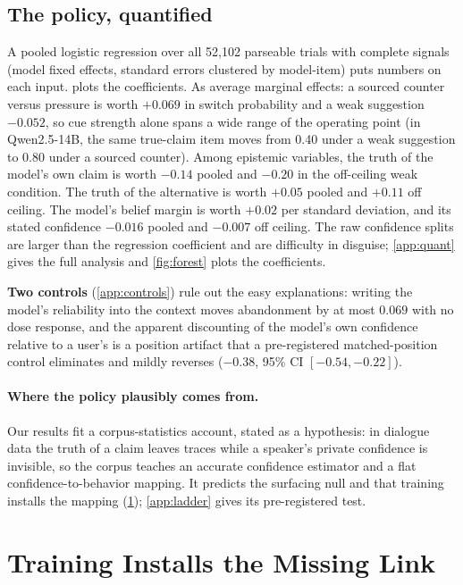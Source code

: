 \documentclass{article}
\begin{document}
\subsection{The policy, quantified}
\label{sec:regression}

A pooled logistic regression over all 52{,}102 parseable trials with complete signals (model fixed effects, standard errors clustered by model-item) puts numbers on each input.  plots the coefficients. As average marginal effects: a sourced counter versus pressure is worth $+0.069$ in switch probability and a weak suggestion $-0.052$, so cue strength alone spans a wide range of the operating point (in Qwen2.5-14B, the same true-claim item moves from 0.40 under a weak suggestion to 0.80 under a sourced counter). Among epistemic variables, the truth of the model's own claim is worth $-0.14$ pooled and $-0.20$ in the off-ceiling weak condition. The truth of the alternative is worth $+0.05$ pooled and $+0.11$ off ceiling. The model's belief margin is worth $+0.02$ per standard deviation, and its stated confidence $-0.016$ pooled and $-0.007$ off ceiling. The raw confidence splits are larger than the regression coefficient and are difficulty in disguise; \cref{app:quant} gives the full analysis and \cref{fig:forest} plots the coefficients.

\label{sec:nulls}\label{sec:reversal}\textbf{Two controls} (\cref{app:controls}) rule out the easy explanations: writing the model's reliability into the context moves abandonment by at most $0.069$ with no dose response, and the apparent discounting of the model's own confidence relative to a user's is a position artifact that a pre-registered matched-position control eliminates and mildly reverses ($-0.38$, 95\% CI $[-0.54,-0.22]$).

\paragraph{Where the policy plausibly comes from.}\label{sec:origin}Our results fit a corpus-statistics account, stated as a hypothesis: in dialogue data the truth of a claim leaves traces while a speaker's private confidence is invisible, so the corpus teaches an accurate confidence estimator and a flat confidence-to-behavior mapping. It predicts the surfacing null and that training installs the mapping (\cref{sec:repair}); \cref{app:ladder} gives its pre-registered test.

\section{Training Installs the Missing Link}
\label{sec:repair}
\end{document}
